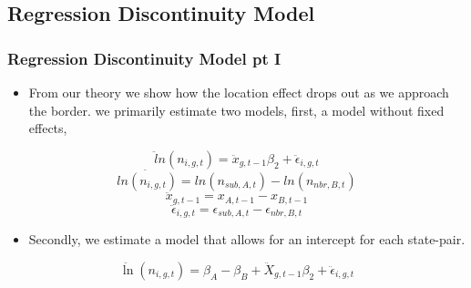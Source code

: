 \documentclass{beamer}
\begin{document}
\begin{frame}
\subsection{Regression Discontinuity Model}
\frametitle{Regression Discontinuity Model pt I}
\begin{itemize}
\item From our theory we show how the location effect drops out as we approach the border. we primarily estimate two models, first, a model without fixed effects,
\end{itemize}

\begin{equation} \label{pols}
\ddot ln(n_{i,g,t}) = \ddot x_{g,t-1}\beta_{2} + \ddot \epsilon_{i,g,t}
\end{equation}
 $$\ddot{ln(n_{i,g,t})} = ln(n_{sub,A,t})-ln(n_{nbr,B,t})$$
 $$\ddot x_{g,t-1} = x_{A,t-1}-x_{B,t-1}$$
 $$\ddot \epsilon_{i,g,t} = \epsilon_{sub,A,t}-\epsilon_{nbr,B,t}$$
\begin{itemize}
\item Secondly, we estimate a model that allows for an intercept for each state-pair.
\end{itemize}
\begin{equation}\label{fe}
\ddot \ln(n_{i,g,t}) = \beta_{A}-\beta_{B}+\ddot X_{g,t-1}\beta_{2} + \ddot \epsilon_{i,g,t}
\end{equation}


\end{frame}
\end{document}
